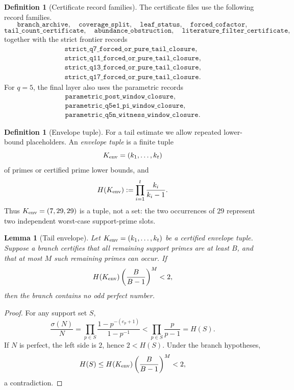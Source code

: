 \documentclass[11pt]{article}
\newtheorem{lemma}[theorem]{Lemma}
\theoremstyle{definition}
\newtheorem{definition}[theorem]{Definition}
\theoremstyle{remark}
\newcommand{\Hfun}{H}
\begin{document}
\begin{definition}[Certificate record families]
The certificate files use the following record families.
\[
  \texttt{branch\_archive},\quad
  \texttt{coverage\_split},\quad
  \texttt{leaf\_status},\quad
  \texttt{forced\_cofactor},
\]
\[
  \texttt{tail\_count\_certificate},\quad
  \texttt{abundance\_obstruction},\quad
  \texttt{literature\_filter\_certificate},
\]
together with the strict frontier records
\[
  \begin{array}{l}
  \texttt{strict\_q7\_forced\_or\_pure\_tail\_closure},\\
  \texttt{strict\_q11\_forced\_or\_pure\_tail\_closure},\\
  \texttt{strict\_q13\_forced\_or\_pure\_tail\_closure},\\
  \texttt{strict\_q17\_forced\_or\_pure\_tail\_closure}.
  \end{array}
\]
For \(q=5\), the final layer also uses the parametric records
\[
  \begin{array}{l}
  \texttt{parametric\_post\_window\_closure},\\
  \texttt{parametric\_q5e1\_pi\_window\_closure},\\
  \texttt{parametric\_q5n\_witness\_window\_closure}.
  \end{array}
\]
\end{definition}

\begin{definition}[Envelope tuple]
\label{def:envelope-tuple}
For a tail estimate we allow repeated lower-bound placeholders.  An
\emph{envelope tuple} is a finite tuple
\[
  K_{\rm env}=(k_1,\ldots,k_t)
\]
of primes or certified prime lower bounds, and
\[
  \Hfun(K_{\rm env})
  :=
  \prod_{i=1}^t\frac{k_i}{k_i-1}.
\]
Thus \(K_{\rm env}=(7,29,29)\) is a tuple, not a set: the two occurrences of
\(29\) represent two independent worst-case support-prime slots.
\end{definition}

\begin{lemma}[Tail envelope]
\label{lem:tail-envelope}
Let \(K_{\rm env}=(k_1,\ldots,k_t)\) be a certified envelope tuple.  Suppose a branch
certifies that all remaining support primes are at least \(B\), and that at
most \(M\) such remaining primes can occur.  If
\[
  \Hfun(K_{\rm env})\left(\frac{B}{B-1}\right)^M<2,
\]
then the branch contains no odd perfect number.
\end{lemma}

\begin{proof}
For any support set \(S\),
\[
  \frac{\sigma(N)}{N}
  =
  \prod_{p\in S}\frac{1-p^{-(e_p+1)}}{1-p^{-1}}
  <
  \prod_{p\in S}\frac{p}{p-1}
  =\Hfun(S).
\]
If \(N\) is perfect, the left side is \(2\), hence \(2<\Hfun(S)\).  Under the
branch hypotheses,
\[
  \Hfun(S)
  \le
  \Hfun(K_{\rm env})\left(\frac{B}{B-1}\right)^M
  <2,
\]
a contradiction.
\end{proof}
\end{document}
